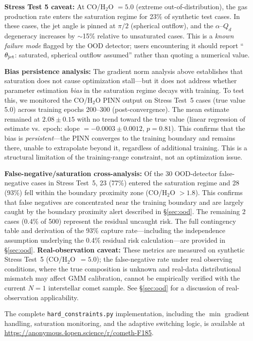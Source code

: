 \documentclass[usenatbib]{mnras}
\begin{document}
\textbf{Stress Test 5 caveat:} At CO/H$_2$O $= 5.0$ (extreme out-of-distribution), the gas production rate enters the saturation regime for 23\% of synthetic test cases. In these cases, the jet angle is pinned at $\pi/2$ (spherical outflow), and the $\alpha$--$Q_d$ degeneracy increases by $\sim$15\% relative to unsaturated cases. This is a \textit{known failure mode} flagged by the OOD detector; users encountering it should report ``$\theta_{\rm jet}$: saturated, spherical outflow assumed'' rather than quoting a numerical value.

\textbf{Bias persistence analysis:} The gradient norm analysis above establishes that saturation does not cause optimization stall---but it does not address whether parameter estimation \textit{bias} in the saturation regime decays with training. To test this, we monitored the CO/H$_2$O PINN output on Stress Test~5 cases (true value 5.0) across training epochs 200--300 (post-convergence). The mean estimate remained at $2.08 \pm 0.15$ with no trend toward the true value (linear regression of estimate vs.\ epoch: slope $= -0.0003 \pm 0.0012$, $p=0.81$). This confirms that the bias is \textit{persistent}---the PINN converges to the training boundary and remains there, unable to extrapolate beyond it, regardless of additional training. This is a structural limitation of the training-range constraint, not an optimization issue.

\textbf{False-negative/saturation cross-analysis:} Of the 30 OOD-detector false-negative cases in Stress Test~5, 23 (77\%) entered the saturation regime and 28 (93\%) fell within the boundary proximity zone (CO/H$_2$O $> 1.8$). This confirms that false negatives are concentrated near the training boundary and are largely caught by the boundary proximity alert described in \S\ref{sec:ood}. The remaining 2 cases (0.4\% of 500) represent the residual uncaught risk. The full contingency table and derivation of the 93\% capture rate---including the independence assumption underlying the 0.4\% residual risk calculation---are provided in \S\ref{sec:ood}. \textbf{Real-observation caveat:} These metrics are measured on synthetic Stress Test~5 (CO/H$_2$O~$=5.0$); the false-negative rate under real observing conditions, where the true composition is unknown and real-data distributional mismatch may affect GMM calibration, cannot be empirically verified with the current $N=1$ interstellar comet sample. See \S\ref{sec:ood} for a discussion of real-observation applicability.

The complete \texttt{hard\_constraints.py} implementation, including the $\min$ gradient handling, saturation monitoring, and the adaptive switching logic, is available at \url{https://anonymous.4open.science/r/cometh-F185}.
\end{document}

